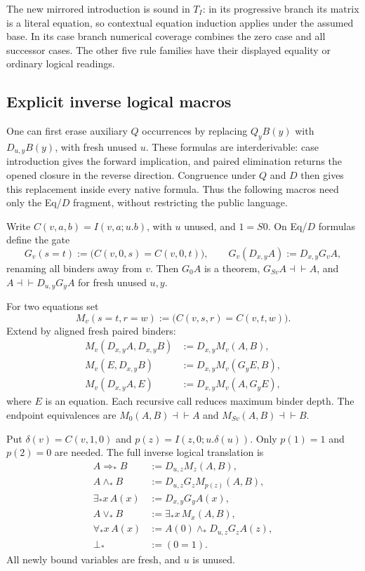 \documentclass[11pt]{article}
\theoremstyle{definition}\newtheorem{definition}[theorem]{Definition}
\begin{document}
The new mirrored introduction is sound in $T_I$: in its progressive
branch its matrix is a literal equation, so contextual equation
induction applies under the assumed base.  In its case branch numerical
coverage combines the zero case and all successor cases.  The other
five rule families have their displayed equality or ordinary logical
readings.

\subsection{Explicit inverse logical macros}\label{sec:choice-introduction}
One can first erase auxiliary $Q$ occurrences by replacing
$Q_yB(y)$ with $D_{u,y}B(y)$, with fresh unused $u$.  These formulas are
interderivable: case introduction gives the forward implication, and
paired elimination returns the opened closure in the reverse direction.
Congruence under $Q$ and $D$ then gives this replacement inside every
native formula.  Thus the following macros need only the Eq/$D$
fragment, without restricting the public language.

Write $C(v,a,b)=I(v,a;u.b)$, with $u$ unused, and $1=S0$.  On Eq/$D$
formulas define the gate
\[
 G_v(s=t):=\bigl(C(v,0,s)=C(v,0,t)\bigr),\qquad
 G_v(D_{x,y}A):=D_{x,y}G_vA,
\]
renaming all binders away from $v$.  Then $G_0A$ is a theorem,
$G_{Sv}A\dashv\vdash A$, and
$A\dashv\vdash D_{u,y}G_yA$ for fresh unused $u,y$.

For two equations set
\[
 M_v(s=t,r=w):=\bigl(C(v,s,r)=C(v,t,w)\bigr).
\]
Extend by aligned fresh paired binders:
\[
\begin{aligned}
 M_v(D_{x,y}A,D_{x,y}B)&:=D_{x,y}M_v(A,B),\\
 M_v(E,D_{x,y}B)&:=D_{x,y}M_v(G_yE,B),\\
 M_v(D_{x,y}A,E)&:=D_{x,y}M_v(A,G_yE),
\end{aligned}
\]
where $E$ is an equation.  Each recursive call reduces maximum binder
depth.  The endpoint equivalences are
$M_0(A,B)\dashv\vdash A$ and $M_{Sv}(A,B)\dashv\vdash B$.

Put $\delta(v)=C(v,1,0)$ and $p(z)=I(z,0;u.\delta(u))$.  Only
$p(1)=1$ and $p(2)=0$ are needed.  The full inverse logical translation is
\[
\begin{aligned}
 A\Rightarrow_*B&:=D_{u,z}M_z(A,B),\\
 A\wedge_*B&:=D_{u,z}G_zM_{p(z)}(A,B),\\
 \exists_*x\,A(x)&:=D_{x,y}G_yA(x),\\
 A\vee_*B&:=\exists_*x\,M_x(A,B),\\
 \forall_*x\,A(x)&:=A(0)\wedge_*D_{u,z}G_zA(z),\\
 \bot_*&:=(0=1).
\end{aligned}
\]
All newly bound variables are fresh, and $u$ is unused.
\end{document}
